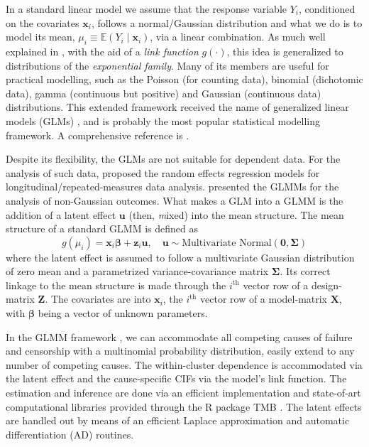 In a standard linear model we assume that the response
variable \(Y_{i}\), conditioned on the covariates \(\bm{x}_{i}\),
follows a normal/Gaussian distribution and what we do is to model its
mean, \(\mu_{i} \equiv \mathbb{E}(Y_{i} \mid \bm{x}_{i})\), via a linear
combination. As much well explained in , with the aid
of a \textit{link function} \(g(\cdot)\), this idea is generalized to
distributions of the \textit{exponential family}. Many of its members
are useful for practical modelling, such as the Poisson (for counting
data), binomial (dichotomic data), gamma (continuous but positive) and
Gaussian (continuous data) distributions. This extended framework
received the name of generalized linear models (GLMs) \cite{GLM72}, and
is probably the most popular statistical modelling framework. A
comprehensive reference is .

 Despite its flexibility, the GLMs are not suitable for dependent
data. For the analysis of such data,  proposed the
random effects regression models for longitudinal/repeated-measures data
analysis.  presented the GLMMs for the analysis of
non-Gaussian outcomes. What makes a GLM into a GLMM is the addition of a
latent effect \(\bm{u}\) (then, \textit{m}ixed) into the mean
structure. The mean structure of a standard GLMM is defined as
\[
  g(\mu_{i}) = \bm{x}_{i}\bm{\beta} + \bm{z}_{i}\bm{u},
  \quad \bm{u} \sim \text{Multivariate Normal}(\bm{0},\bm{\Sigma})
\]
where the latent effect is assumed to follow a multivariate Gaussian
distribution of zero mean and a parametrized variance-covariance matrix
\(\bm{\Sigma}\). Its correct linkage to the mean structure is made
through the \(i^\text{th}\) vector row of a design-matrix \(\bm{Z}\).
The covariates are into \(\bm{x}_{i}\), the \(i^\text{th}\) vector row
of a model-matrix \(\bm{X}\), with \(\bm{\beta}\) being a vector of
unknown parameters.

In the GLMM framework \cite{GLMM}, we can accommodate all competing
causes of failure and censorship with a multinomial probability
distribution, easily extend to any number of competing causes. The
within-cluster dependence is accommodated via the latent effect and the
cause-specific CIFs via the model's link function. The estimation and
inference are done via an efficient implementation and state-of-art
computational libraries provided through the R \cite{R21} package
TMB \cite{TMB}. The latent effects are handled out by means of an
efficient Laplace approximation \cite{corestats,patrao} and automatic
differentiation (AD)
\cite{corestats,peyre} routines.

